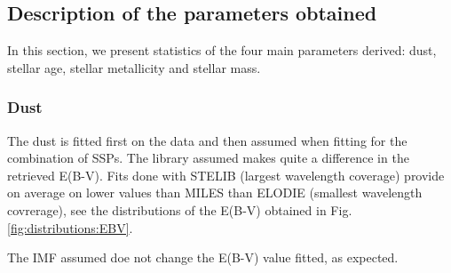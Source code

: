 \documentclass[onecolumn]{aa}
\begin{document}


\subsection{Description of the parameters obtained}
In this section, we present statistics of the four main parameters derived: dust, stellar age, stellar metallicity and stellar mass.

\subsubsection{Dust}
The dust is fitted first on the data and then assumed when fitting for the combination of SSPs. 
The library assumed makes quite a difference in the retrieved E(B-V). 
Fits done with STELIB (largest wavelength coverage) provide on average on lower values than MILES than ELODIE (smallest wavelength covrerage), see the distributions of the E(B-V) obtained in Fig. \ref{fig:distributions:EBV}. 

The IMF assumed doe not change the E(B-V) value fitted, as expected.
\end{document}
